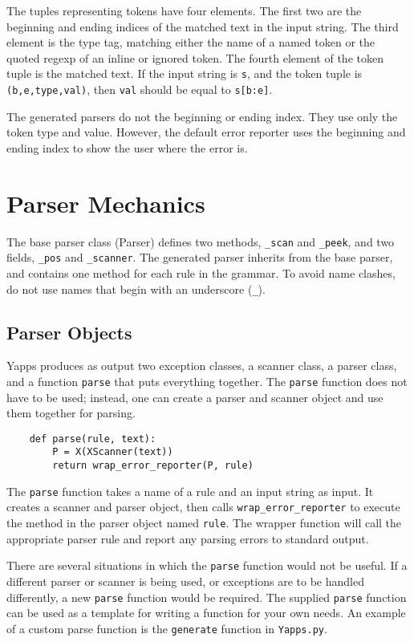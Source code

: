 \documentclass[10pt]{article}
\newcommand{\mysection}[1]{\section{#1}}
\newcommand{\mysubsection}[1]{\subsection{#1}}
\begin{document}
The tuples representing tokens have four elements.  The first two are
the beginning and ending indices of the matched text in the input
string.  The third element is the type tag, matching either the name
of a named token or the quoted regexp of an inline or ignored token.
The fourth element of the token tuple is the matched text.  If the
input string is \texttt{s}, and the token tuple is
\texttt{(b,e,type,val)}, then \texttt{val} should be equal to
\texttt{s[b:e]}.

The generated parsers do not the beginning or ending index.  They use
only the token type and value.  However, the default error reporter
uses the beginning and ending index to show the user where the error
is.

\mysection{Parser Mechanics}

The base parser class (Parser) defines two methods, \texttt{\_scan}
and \texttt{\_peek}, and two fields, \texttt{\_pos} and
\texttt{\_scanner}.  The generated parser inherits from the base
parser, and contains one method for each rule in the grammar.  To
avoid name clashes, do not use names that begin with an underscore
(\texttt{\_}).

\mysubsection{Parser Objects}
\label{sec:Parser-Objects}

Yapps produces as output two exception classes, a scanner class, a
parser class, and a function \texttt{parse} that puts everything
together.  The \texttt{parse} function does not have to be used;
instead, one can create a parser and scanner object and use them
together for parsing.

\begin{verbatim}
    def parse(rule, text):
        P = X(XScanner(text))
        return wrap_error_reporter(P, rule)
\end{verbatim}

The \texttt{parse} function takes a name of a rule and an input string
as input.  It creates a scanner and parser object, then calls
\texttt{wrap\_error\_reporter} to execute the method in the parser
object named \texttt{rule}.  The wrapper function will call the
appropriate parser rule and report any parsing errors to standard
output.

There are several situations in which the \texttt{parse} function
would not be useful.  If a different parser or scanner is being used,
or exceptions are to be handled differently, a new \texttt{parse}
function would be required.  The supplied \texttt{parse} function can
be used as a template for writing a function for your own needs.  An
example of a custom parse function is the \texttt{generate} function
in \texttt{Yapps.py}.
\end{document}
